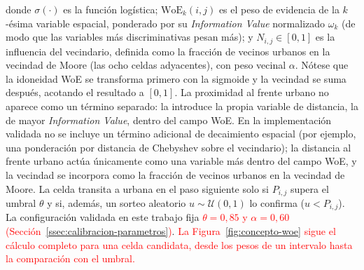 donde $\sigma(\cdot)$ es la función logística; $\mathrm{WoE}_k(i,j)$ es el peso de evidencia de la $k$-ésima variable espacial, ponderado por su \textit{Information Value} normalizado $\omega_k$ (de modo que las variables más discriminativas pesan más); y $N_{i,j} \in [0,1]$ es la influencia del vecindario, definida como la fracción de vecinos urbanos en la vecindad de Moore (las ocho celdas adyacentes), con peso vecinal $\alpha$. Nótese que la idoneidad WoE se transforma primero con la sigmoide y la vecindad se suma después, acotando el resultado a $[0,1]$. La proximidad al frente urbano no aparece como un término separado: la introduce la propia variable de distancia, la de mayor \textit{Information Value}, dentro del campo WoE. En la implementación validada no se incluye un término adicional de decaimiento espacial (por ejemplo, una ponderación por distancia de Chebyshev sobre el vecindario); la distancia al frente urbano actúa únicamente como una variable más dentro del campo WoE, y la vecindad se incorpora como la fracción de vecinos urbanos en la vecindad de Moore. La celda transita a urbana en el paso siguiente solo si $P_{i,j}$ supera el umbral $\theta$ y si, además, un sorteo aleatorio $u \sim \mathcal{U}(0,1)$ lo confirma ($u < P_{i,j}$). La configuración validada en este trabajo fija \textcolor{red}{$\theta = 0{,}85$ y $\alpha = 0{,}60$ (Sección~\ref{ssec:calibracion-parametros})}. \textcolor{red}{La Figura~\ref{fig:concepto-woe} sigue el cálculo completo para una celda candidata, desde los pesos de un intervalo hasta la comparación con el umbral.}

